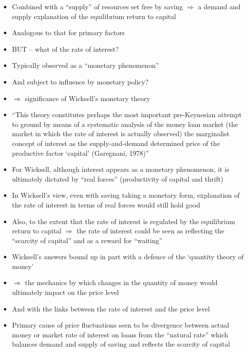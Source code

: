 \documentclass[a4paper,twoside]{article}
\numberwithin{equation}{section}
\numberwithin{figure}{section}
\begin{document}
\begin{itemize}
\begin{figure}[H]
		\end{figure}
		\item Combined with a ``supply'' of resources set free by saving \( \Rightarrow \) a demand and supply explanation of the equilibrium return to capital 
		\item Analogous to that for primary factors
		\item BUT -- what of the rate of interest?
		\item Typically observed as a ``monetary phenomenon''
		\item And subject to influence by monetary policy?
		\item \( \Rightarrow \) significance of Wicksell's monetary theory
		\item  ``This theory constitutes perhaps the most important pre-Keynesian attempt to ground by means of a systematic analysis of the money loan market (the market in which the rate of interest is actually observed) the marginalist concept of interest as the supply-and-demand determined price of the productive factor `capital' (Garegnani, 1978)''
		\item For Wicksell, although interest appears as a monetary phenomenon, it is ultimately dictated by ``real forces'' (productivity of capital and thrift)
		\item In Wicksell's view, even with saving taking a monetary form, explanation of the rate of interest in terms of real forces would still hold good
		\item Also, to the extent that the rate of interest is regulated by the equilibrium return to capital \( \Rightarrow \) the rate of interest could be seen as reflecting the ``scarcity of capital'' and as a reward for ``waiting''
		\item  Wicksell's answers bound up in part with a defence of the `quantity theory of money'
		\item \( \Rightarrow \) the mechanics by which changes in the quantity of money would ultimately impact on the price level
		\item And with the links between the rate of interest and the price level
		\item Primary cause of price fluctuations seen to be divergence between actual money or market rate of interest on loans from the ``natural rate'' which balances demand and supply of saving and reflects the scarcity of capital

\end{itemize}
\end{document}
